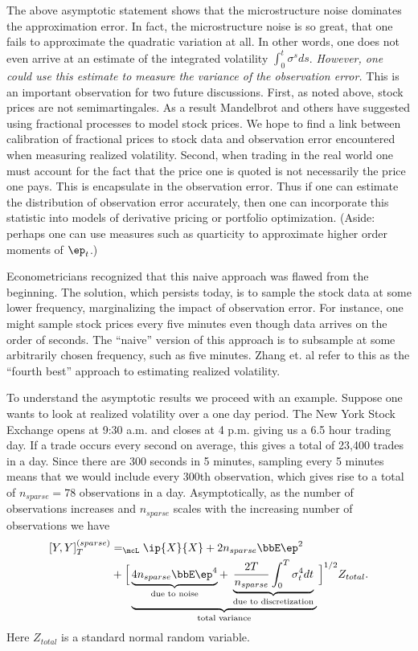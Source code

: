 \documentclass{report}
\begin{document}
The above asymptotic statement shows that the microstructure noise
dominates the approximation error.  In fact, the microstructure noise
is so great, that one fails to approximate the quadratic variation at
all.  In other words, one does not even arrive at an estimate of the
integrated volatility
$\int_0^t \sigma^s ds$.  \emph{However, one could use this estimate to
measure the variance of the observation error.}  This is an important
observation for two future discussions.  First, as noted above, stock
prices are not semimartingales.  As a result Mandelbrot and others
have suggested using fractional processes to model stock prices.  We
hope to find a link between calibration of fractional prices to stock
data and observation error encountered when measuring realized
volatility.  Second, when trading in the real world one must account
for the fact that the price one is quoted is not necessarily the price
one pays.  This is encapsulate in the observation error.  Thus if one
can estimate the distribution of observation error accurately, then
one can incorporate this statistic into models of derivative pricing
or portfolio optimization.  (Aside: perhaps one can use measures such
as quarticity to approximate higher order moments of $\ep_t$.)

Econometricians recognized that this naive approach was flawed from
the beginning.  The solution, which persists today, is to sample the
stock data at some lower frequency, marginalizing the impact of
observation error.  For instance, one might sample stock prices every
five minutes even though data arrives on the order of seconds.  The
``naive'' version of this approach is to subsample at some arbitrarily
chosen frequency, such as five minutes.  Zhang et. al refer to this as
the ``fourth best'' approach to estimating realized volatility.

To understand the asymptotic results we proceed with an example. 
Suppose one wants to look at realized volatility over a one day
period.  The New York Stock Exchange opens at 9:30 a.m. and closes at
4 p.m. giving us a 6.5 hour trading day.  If a trade occurs every
second on average, this gives a total of 23,400 trades in a day. 
Since there are 300 seconds in 5 minutes, sampling every 5 minutes
means that we would include every 300th observation, which gives rise
to a total of $n_{sparse} = 78$ observations in a day. 
Asymptotically, as the number of observations increases and
$n_{sparse}$ scales with the increasing number of observations we have
\begin{displaymath}
\begin{split}
[Y,Y]_T^{(sparse)} & =_{\mcL} \ip{X}{X} + 2 n_{sparse} \bbE \ep^2 \\
& + 
\Big[ 
\underbrace{
  \underbrace{4 n_{sparse} \bbE \ep^4}_{\textmd{ due to noise }} 
  + 
  \underbrace{\frac{2T}{n_{sparse}}  
    \int_0^T \sigma_t^4 dt}_{\textmd{ due to discretization }}
}_{\textmd{ total variance }}
\Big]^{1/2} Z_{total}.
\end{split}
\end{displaymath}
Here $Z_{total}$ is a standard normal random variable.
\end{document}
